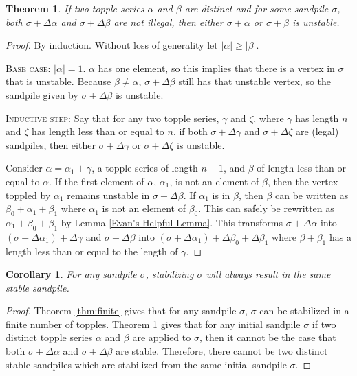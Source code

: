 \documentclass[12pt]{article}
\newtheorem{theorem}{Theorem}
\newtheorem{corollary}{Corollary}
\begin{document}
\begin{theorem} \label{thm:headache}
    If two topple series $\alpha$ and $\beta$ are distinct and for some sandpile $\sigma$, both $\sigma + \Delta \alpha$ and $\sigma + \Delta \beta$ are not illegal, then either $\sigma + \alpha$ or $\sigma + \beta$ is unstable.
\end{theorem}
\begin{proof}
    By induction.  Without loss of generality let $|\alpha| \geq |\beta|$.
    
    \textsc{Base case:}  $|\alpha|=1$.  $\alpha$ has one element, so this implies that there is a vertex in $\sigma$ that is unstable.  Because $\beta \neq \alpha$, $\sigma + \Delta \beta$ still has that unstable vertex, so the sandpile given by $\sigma + \Delta \beta$ is unstable.
    
    \textsc{Inductive step:}  Say that for any two topple series, $\gamma$ and $\zeta$, where $\gamma$ has length $n$ and $\zeta$ has length less than or equal to $n$, if both $\sigma + \Delta \gamma$ and $\sigma + \Delta \zeta$ are (legal) sandpiles, then either $\sigma + \Delta \gamma$ or $\sigma + \Delta \zeta$ is unstable.

    Consider $\alpha=\alpha_1+\gamma$, a topple series of length $n+1$, and $\beta$ of length less than or equal to $\alpha$.  If the first element of $\alpha$, $\alpha_1$, is not an element of $\beta$, then the vertex toppled by $\alpha_1$ remains unstable in $\sigma + \Delta \beta$.  If $\alpha_1$ is in $\beta$, then $\beta$ can be written as $\beta_0+\alpha_1+\beta_1$ where $\alpha_1$ is not an element of $\beta_0$.  This can safely be rewritten as $\alpha_1 + \beta_0 + \beta_1$ by Lemma \ref{Evan's Helpful Lemma}.  This transforms $\sigma + \Delta \alpha$ into $(\sigma + \Delta \alpha_1) + \Delta \gamma$ and $\sigma + \Delta \beta$ into $(\sigma + \Delta \alpha_1) + \Delta \beta_0 + \Delta \beta_1$ where $\beta+\beta_1$ has a length less than or equal to the length of $\gamma$.
\end{proof}

\begin{corollary}
    For any sandpile $\sigma$, stabilizing $\sigma$ will always result in the same stable sandpile.
    \label{thm:unique}
\end{corollary}
\begin{proof}
    Theorem \ref{thm:finite} gives that for any sandpile $\sigma$, $\sigma$ can be stabilized in a finite number of topples.  Theorem \ref{thm:headache} gives that for any initial sandpile $\sigma$ if two distinct topple series $\alpha$ and $\beta$ are applied to $\sigma$, then it cannot be the case that both $\sigma + \Delta \alpha$ and $\sigma + \Delta \beta$ are stable.  Therefore, there cannot be two distinct stable sandpiles which are stabilized from the same initial sandpile $\sigma$.
\end{proof}
\end{document}
